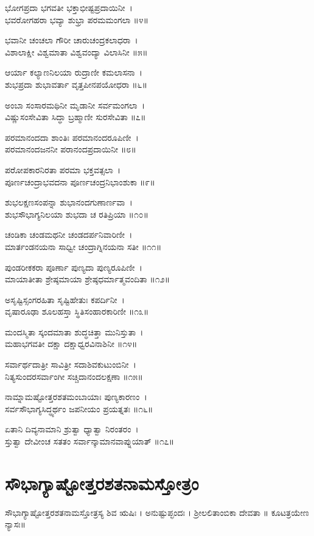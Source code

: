 ಭೋಗಪ್ರದಾ ಭಗವತೀ ಭಕ್ತಾಭೀಷ್ಟಪ್ರದಾಯಿನೀ~।\\
ಭವರೋಗಹರಾ ಭವ್ಯಾ ಶುಭ್ರಾ ಪರಮಮಂಗಲಾ ॥೪॥

ಭವಾನೀ ಚಂಚಲಾ ಗೌರೀ ಚಾರುಚಂದ್ರಕಲಾಧರಾ~।\\
ವಿಶಾಲಾಕ್ಷೀ ವಿಶ್ವಮಾತಾ ವಿಶ್ವವಂದ್ಯಾ ವಿಲಾಸಿನೀ ॥೫॥

ಆರ್ಯಾ ಕಲ್ಯಾಣನಿಲಯಾ ರುದ್ರಾಣೀ ಕಮಲಾಸನಾ~।\\
ಶುಭಪ್ರದಾ ಶುಭಾವರ್ತಾ ವೃತ್ತಪೀನಪಯೋಧರಾ ॥೬॥

ಅಂಬಾ ಸಂಸಾರಮಥಿನೀ ಮೃಡಾನೀ ಸರ್ವಮಂಗಲಾ~।\\
ವಿಷ್ಣುಸಂಸೇವಿತಾ ಸಿದ್ಧಾ ಬ್ರಹ್ಮಾಣೀ ಸುರಸೇವಿತಾ ॥೭॥

ಪರಮಾನಂದದಾ ಶಾಂತಿಃ ಪರಮಾನಂದರೂಪಿಣೀ~।\\
ಪರಮಾನಂದಜನನೀ ಪರಾನಂದಪ್ರದಾಯಿನೀ ॥೮॥

ಪರೋಪಕಾರನಿರತಾ ಪರಮಾ ಭಕ್ತವತ್ಸಲಾ~।\\
ಪೂರ್ಣಚಂದ್ರಾಭವದನಾ ಪೂರ್ಣಚಂದ್ರನಿಭಾಂಶುಕಾ ॥೯॥

ಶುಭಲಕ್ಷಣಸಂಪನ್ನಾ ಶುಭಾನಂದಗುಣಾರ್ಣವಾ~।\\
ಶುಭಸೌಭಾಗ್ಯನಿಲಯಾ ಶುಭದಾ ಚ ರತಿಪ್ರಿಯಾ ॥೧೦॥

ಚಂಡಿಕಾ ಚಂಡಮಥನೀ ಚಂಡದರ್ಪನಿವಾರಿಣೀ~।\\
ಮಾರ್ತಂಡನಯನಾ ಸಾಧ್ವೀ ಚಂದ್ರಾಗ್ನಿನಯನಾ ಸತೀ ॥೧೧॥

ಪುಂಡರೀಕಕರಾ ಪೂರ್ಣಾ ಪುಣ್ಯದಾ ಪುಣ್ಯರೂಪಿಣೀ~।\\
ಮಾಯಾತೀತಾ ಶ್ರೇಷ್ಠಮಾಯಾ ಶ್ರೇಷ್ಠಧರ್ಮಾತ್ಮವಂದಿತಾ ॥೧೨॥

ಅಸೃಷ್ಟಿಸ್ಸಂಗರಹಿತಾ ಸೃಷ್ಟಿಹೇತುಃ ಕಪರ್ದಿನೀ~।\\
ವೃಷಾರೂಢಾ ಶೂಲಹಸ್ತಾ ಸ್ಥಿತಿಸಂಹಾರಕಾರಿಣೀ ॥೧೩॥

ಮಂದಸ್ಮಿತಾ ಸ್ಕಂದಮಾತಾ ಶುದ್ಧಚಿತ್ತಾ ಮುನಿಸ್ತುತಾ~।\\
ಮಹಾಭಗವತೀ ದಕ್ಷಾ ದಕ್ಷಾಧ್ವರವಿನಾಶಿನೀ ॥೧೪॥

ಸರ್ವಾರ್ಥದಾತ್ರೀ ಸಾವಿತ್ರೀ ಸದಾಶಿವಕುಟುಂಬಿನೀ~।\\
ನಿತ್ಯಸುಂದರಸರ್ವಾಂಗೀ ಸಚ್ಚಿದಾನಂದಲಕ್ಷಣಾ ॥೧೫॥

ನಾಮ್ನಾಮಷ್ಟೋತ್ತರಶತಮಂಬಾಯಾಃ ಪುಣ್ಯಕಾರಣಂ~।\\
ಸರ್ವಸೌಭಾಗ್ಯಸಿದ್ಧ್ಯರ್ಥಂ ಜಪನೀಯಂ ಪ್ರಯತ್ನತಃ ॥೧೬॥

ಏತಾನಿ ದಿವ್ಯನಾಮಾನಿ ಶ್ರುತ್ವಾ ಧ್ಯಾತ್ವಾ ನಿರಂತರಂ~।\\
ಸ್ತುತ್ವಾ ದೇವೀಂಚ ಸತತಂ ಸರ್ವಾನ್ಕಾಮಾನವಾಪ್ನುಯಾತ್ ॥೧೭॥
\section{ಸೌಭಾಗ್ಯಾಷ್ಟೋತ್ತರಶತನಾಮಸ್ತೋತ್ರಂ }
ಸೌಭಾಗ್ಯಾಷ್ಟೋತ್ತರಶತನಾಮಸ್ತೋತ್ರಸ್ಯ ಶಿವ ಋಷಿಃ । ಅನುಷ್ಟುಪ್ಛಂದಃ । ಶ್ರೀಲಲಿತಾಂಬಿಕಾ  ದೇವತಾ ॥
ಕೂಟತ್ರಯೇಣ ನ್ಯಾಸಃ॥

